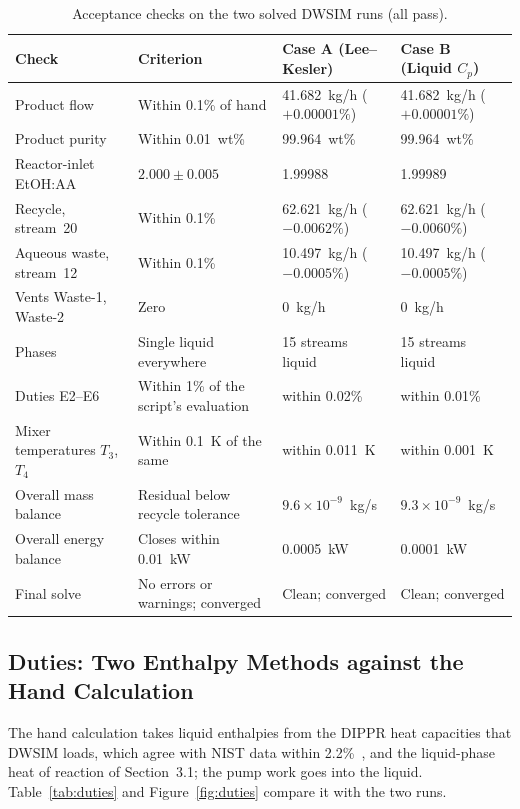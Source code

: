 \documentclass[10pt,a4paper]{article}
\newcommand{\hdrrow}{}
\begin{document}
\begin{table}[H]
\centering
\caption{Acceptance checks on the two solved DWSIM runs (all pass).}
\label{tab:checks}
\small
\begin{tabularx}{\textwidth}{|C{3.2cm}|Y|C{3.5cm}|C{3.5cm}|}
\hline
\hdrrow
\textbf{Check} & \textbf{Criterion} & \textbf{Case A (Lee--Kesler)} & \textbf{Case B (Liquid $C_p$)} \\
\hline
Product flow & Within 0.1\% of hand & 41.682~kg/h ($+0.00001\%$) & 41.682~kg/h ($+0.00001\%$) \\
\hline
Product purity & Within 0.01~wt\% & 99.964~wt\% & 99.964~wt\% \\
\hline
Reactor-inlet EtOH:AA & $2.000 \pm 0.005$ & 1.99988 & 1.99989 \\
\hline
Recycle, stream~20 & Within 0.1\% & 62.621~kg/h ($-0.0062\%$) & 62.621~kg/h ($-0.0060\%$) \\
\hline
Aqueous waste, stream~12 & Within 0.1\% & 10.497~kg/h ($-0.0005\%$) & 10.497~kg/h ($-0.0005\%$) \\
\hline
Vents Waste-1, Waste-2 & Zero & 0~kg/h & 0~kg/h \\
\hline
Phases & Single liquid everywhere & 15 streams liquid & 15 streams liquid \\
\hline
Duties E2--E6 & Within 1\% of the script's evaluation & within 0.02\% & within 0.01\% \\
\hline
Mixer temperatures $T_3$, $T_4$ & Within 0.1~K of the same & within 0.011~K & within 0.001~K \\
\hline
Overall mass balance & Residual below recycle tolerance & $9.6 \times 10^{-9}$~kg/s & $9.3 \times 10^{-9}$~kg/s \\
\hline
Overall energy balance & Closes within 0.01~kW & 0.0005~kW & 0.0001~kW \\
\hline
Final solve & No errors or warnings; converged & Clean; converged & Clean; converged \\
\hline
\end{tabularx}
\end{table}

\subsection{Duties: Two Enthalpy Methods against the Hand Calculation}
\label{sec:duties}

The hand calculation takes liquid enthalpies from the DIPPR heat capacities that DWSIM loads, which agree with NIST data within 2.2\%~\cite{ref5}, and the liquid-phase heat of reaction of Section~3.1; the pump work goes into the liquid. Table~\ref{tab:duties} and Figure~\ref{fig:duties} compare it with the two runs.
\end{document}
